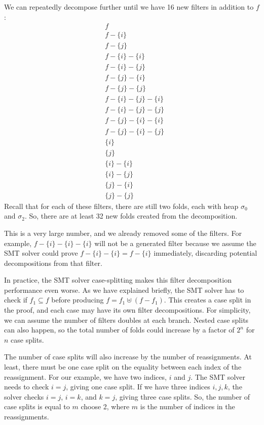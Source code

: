 \documentclass[msc,oneside]{ubcthesis}
\begin{document}
We can repeatedly decompose further until we have 16 new filters in addition to $f$:
\begin{align*} 
&f \\
&f - \{i\}  \\
&f - \{j\}  \\
&f - \{i\} - \{i\}   \\
&f - \{i\} - \{j\}   \\
&f - \{j\} - \{i\}   \\
&f - \{j\} - \{j\}   \\
&f - \{i\} - \{j\} - \{i\}   \\
&f - \{i\} - \{j\} - \{j\}   \\
&f - \{j\} - \{i\} - \{i\}  \\
&f - \{j\} - \{i\} - \{j\}  \\
&\{i\}  \\
&\{j\}  \\
&\{i\} -\{i\}  \\
&\{i\} -\{j\}  \\
&\{j\} -\{i\}  \\
&\{j\} -\{j\}  
\end{align*}
Recall that for each of these filters, there are still two folds, each with heap $\sigma_0$ and $\sigma_2$. So, there are at least 32 new folds created from the decomposition. 

This is a very large number, and we already removed some of the filters. For example, $f - \{i\} - \{i\} - \{i\}$ will not be a generated filter because we assume the SMT solver could prove $f - \{i\} - \{i\} = f - \{i\}$ immediately, discarding potential decompositions from that filter.

In practice, the SMT solver case-splitting makes this filter decomposition performance even worse. As we have explained briefly, the SMT solver has to check if $f_1 \subseteq f$ before producing $f = f_1 \uplus (f - f_1)$. This creates a case split in the proof, and each case may have its own filter decompositions. For simplicity, we can assume the number of filters doubles at each branch. Nested case splits can also happen, so the total number of folds could increase by a factor of $2^n$ for $n$ case splits. 

The number of case splits will also increase by the number of reassignments. At least, there must be one case split on the equality between each index of the reassignment. For our example, we have two indices, $i$ and $j$. The SMT solver needs to check $i = j$, giving one case split. If we have three indices $i,j,k$, the solver checks $i=j$, $i=k$, and $k=j$, giving three case splits. So, the number of case splits is equal to $m$ choose 2, where $m$ is the number of indices in the reassignments.
\end{document}
